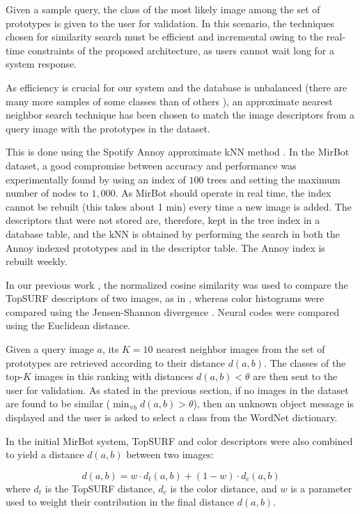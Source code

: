 \documentclass[final, twocolumn]{elsarticle}
\begin{document}
Given a sample query, the class of the most likely image among the set of prototypes is given to the user for validation. In this scenario, the techniques chosen for similarity search must be efficient and incremental owing to the real-time constraints of the proposed architecture, as users cannot wait long for a system response. 

As efficiency is crucial for our system and the database is unbalanced (there are many more samples of some classes than of others \cite{He09}), an approximate nearest neighbor search technique has been chosen to match the image descriptors from a query image with the prototypes in the dataset. 

This is done using the Spotify Annoy approximate kNN method \cite{annoy}. In the MirBot dataset, a good compromise between accuracy and performance was experimentally found by using an index of $100$ trees and setting the maximum number of nodes to $1,000$. As MirBot should operate in real time, the index cannot be rebuilt (this takes about 1 min) every time a new image is added. The descriptors that were not stored are, therefore, kept in the tree index in a database table, and the kNN is obtained by performing the search in both the Annoy indexed prototypes and in the descriptor table. The Annoy index is rebuilt weekly.

In our previous work \cite{MirBot:System}, the normalized cosine similarity was used to compare the TopSURF descriptors of two images, as in \cite{Thomee2010TOP-SURF:Toolkit}, whereas color histograms were compared using the Jensen-Shannon divergence \citep{Lin1991DivergenceEntropy}. Neural codes were compared using the Euclidean distance.

Given a query image $a$, its $K=10$ nearest neighbor images from the set of prototypes are retrieved according to their distance $d(a,b)$. The classes of the top-$K$ images in this ranking with distances $d(a,b)<\theta$  are then sent to the user for validation. As stated in the previous section, if no images in the dataset are found to be similar ($\min_{\forall{b}} {d(a,b)>\theta}$), then an unknown object message is displayed and the user is asked to select a class from the WordNet dictionary. 

In the initial MirBot system, TopSURF and color descriptors were also combined to yield a distance $d(a,b)$ between two images:

\begin{equation}
\label{eqWeight}
d(a,b)=w \cdot d_{t}(a,b) + (1-w) \cdot d_{c}(a,b)
\end{equation}\noindent where $d_t$ is the TopSURF distance, $d_c$ is the color distance, and $w$ is a parameter used to weight their contribution in the final distance $d(a,b)$.
\end{document}

